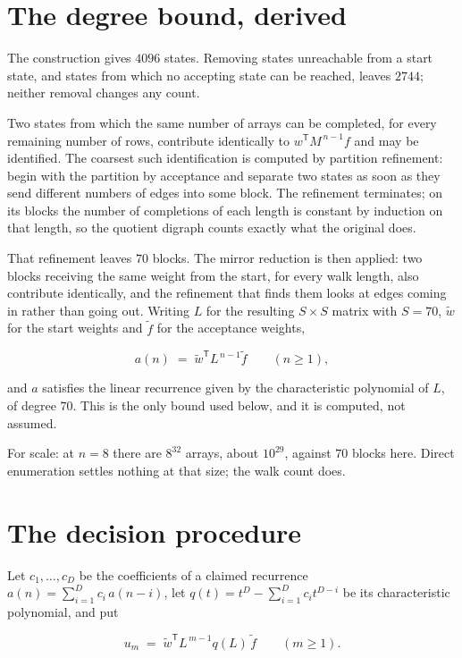 \documentclass[11pt]{article}
\theoremstyle{definition}
\begin{document}
\section{The degree bound, derived}

The construction gives $4096$ states. Removing states unreachable from a start state, and states from which no accepting state can be reached, leaves $2744$; neither removal changes any count.

Two states from which the same number of arrays can be completed, for every remaining number of rows, contribute identically to $w^{\mathsf T}M^{\,n-1}f$ and may be identified. The coarsest such identification is computed by partition refinement: begin with the partition by acceptance and separate two states as soon as they send different numbers of edges into some block. The refinement terminates; on its blocks the number of completions of each length is constant by induction on that length, so the quotient digraph counts exactly what the original does.

That refinement leaves $70$ blocks. The mirror reduction is then applied: two blocks receiving the same weight from the start, for every walk length, also contribute identically, and the refinement that finds them looks at edges coming in rather than going out. Writing $L$ for the resulting $S \times S$ matrix with $S = 70$, $\tilde w$ for the start weights and $\tilde f$ for the acceptance weights,

\[a(n) \;=\; \tilde w^{\mathsf T} L^{\,n-1} \tilde f \qquad (n \ge 1),\]

and $a$ satisfies the linear recurrence given by the characteristic polynomial of $L$, of degree $70$. This is the only bound used below, and it is computed, not assumed.

For scale: at $n = 8$ there are $8^{32}$ arrays, about $10^{29}$, against $70$ blocks here. Direct enumeration settles nothing at that size; the walk count does.

\section{The decision procedure}

Let $c_1,\dots,c_D$ be the coefficients of a claimed recurrence $a(n) = \sum_{i=1}^{D} c_i\,a(n-i)$, let $q(t) = t^{D} - \sum_{i=1}^{D} c_i t^{D-i}$ be its characteristic polynomial, and put

\[u_m \;=\; \tilde w^{\mathsf T} L^{\,m-1} q(L)\,\tilde f \qquad (m \ge 1).\]
\end{document}
